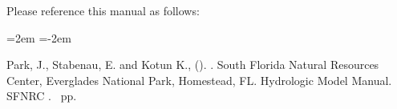 \begingroup

\noindent Please reference this manual as follows:

\leftskip=2em
\parindent=-2em

Park, J., Stabenau, E. and Kotun K., (\pubyear). \titleinfo. South Florida Natural Resources Center, Everglades National Park, Homestead, FL. Hydrologic Model Manual. SFNRC \reportnumber. \pageref{LastPage}~pp.

\endgroup

\rmfamily
\large
\cleardoublepage

